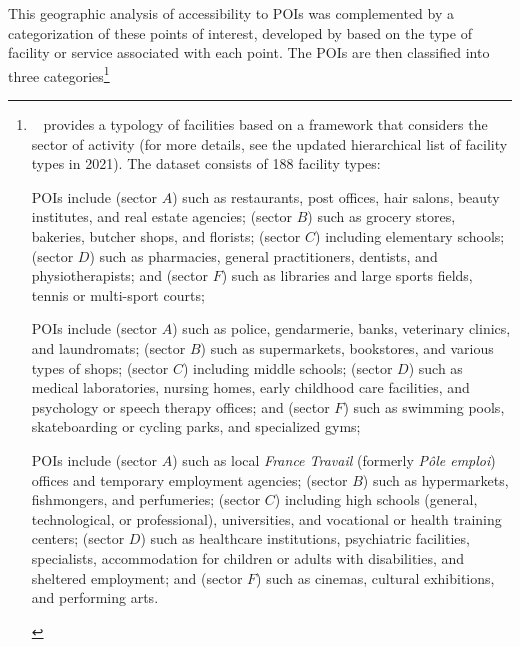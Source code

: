 \begin{refsegment}
This geographic analysis of accessibility to \acrshort{POIs} was complemented by a categorization of these points of interest, developed by \textcolor{blue}{\textcite{insee_base_2021}} based on the type of facility or service associated with each point. The \acrshort{POIs} are then classified into three categories\footnote{~
    \textcolor{blue}{\textcite{insee_base_2021}} provides a typology of facilities based on a framework that considers the sector of activity (for more details, see the updated hierarchical list of facility types in 2021). The dataset consists of 188 facility types:
    \begin{customitemize}
        \item {} \acrshort{POIs} include  (sector \(A\)) such as restaurants, post offices, hair salons, beauty institutes, and real estate agencies;  (sector \(B\)) such as grocery stores, bakeries, butcher shops, and florists;  (sector \(C\)) including elementary schools;  (sector \(D\)) such as pharmacies, general practitioners, dentists, and physiotherapists; and  (sector \(F\)) such as libraries and large sports fields, tennis or multi-sport courts;
        \item {} \acrshort{POIs} include  (sector \(A\)) such as police, gendarmerie, banks, veterinary clinics, and laundromats;  (sector \(B\)) such as supermarkets, bookstores, and various types of shops;  (sector \(C\)) including middle schools;  (sector \(D\)) such as medical laboratories, nursing homes, early childhood care facilities, and psychology or speech therapy offices; and  (sector \(F\)) such as swimming pools, skateboarding or cycling parks, and specialized gyms;
        \item {} \acrshort{POIs} include  (sector \(A\)) such as local \textsl{France Travail} (formerly \textsl{Pôle emploi}) offices and temporary employment agencies;  (sector \(B\)) such as hypermarkets, fishmongers, and perfumeries;  (sector \(C\)) including high schools (general, technological, or professional), universities, and vocational or health training centers;  (sector \(D\)) such as healthcare institutions, psychiatric facilities, specialists, accommodation for children or adults with disabilities, and sheltered employment; and  (sector \(F\)) such as cinemas, cultural exhibitions, and performing arts.

\end{customitemize}}
\end{refsegment}
